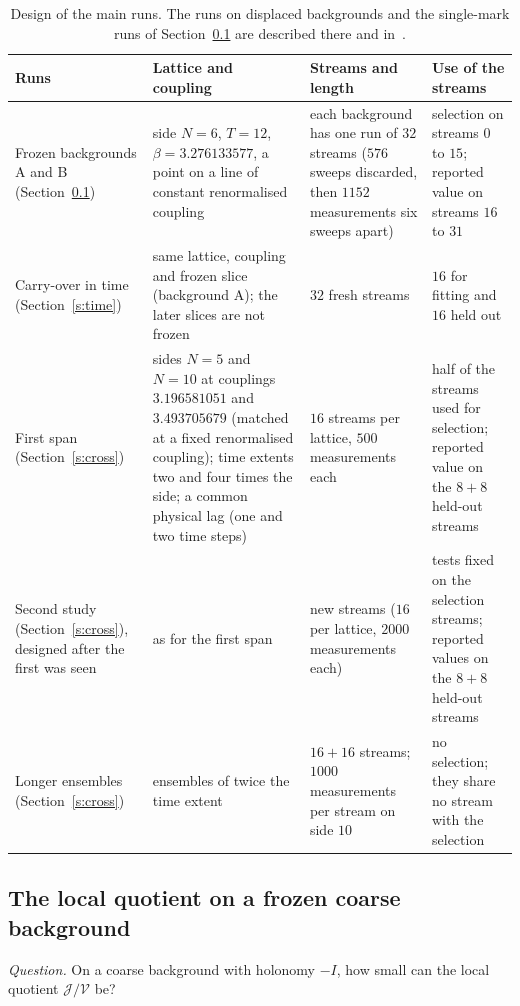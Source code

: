 \begin{table}[t]
\centering\small
\begin{tabular}{@{}>{\raggedright\arraybackslash}p{}>{\raggedright\arraybackslash}p{}>{\raggedright\arraybackslash}p{}>{\raggedright\arraybackslash}p{}@{}}
\toprule
Runs & Lattice and coupling & Streams and length & Use of the streams \\
\midrule
Frozen backgrounds \textsf{A} and \textsf{B} (Section~\ref{s:local}) &
side $N=6$, $T=12$, $\beta=3.276133577$, a point on a line of constant renormalised coupling &
each background has one run of $32$ streams ($576$ sweeps discarded, then $1152$ measurements six sweeps apart) &
selection on streams $0$ to $15$; reported value on streams $16$ to $31$ \\
\addlinespace
Carry-over in time (Section~\ref{s:time}) &
same lattice, coupling and frozen slice (background \textsf{A}); the later slices are not frozen &
$32$ fresh streams &
$16$ for fitting and $16$ held out \\
\addlinespace
First span (Section~\ref{s:cross}) &
sides $N=5$ and $N=10$ at couplings $3.196581051$ and $3.493705679$ (matched at a fixed renormalised
coupling); time extents two and four times the side; a common physical lag (one and two time steps) &
$16$ streams per lattice, $500$ measurements each &
half of the streams used for selection; reported value on the $8+8$ held-out streams \\
\addlinespace
Second study (Section~\ref{s:cross}), designed after the first was seen &
as for the first span &
new streams ($16$ per lattice, $2000$ measurements each) &
tests fixed on the selection streams; reported values on the $8+8$ held-out streams \\
\addlinespace
Longer ensembles (Section~\ref{s:cross}) &
ensembles of twice the time extent &
$16+16$ streams; $1000$ measurements per stream on side $10$ &
no selection; they share no stream with the selection \\
\bottomrule
\end{tabular}
\caption{Design of the main runs. The runs on displaced backgrounds and the single-mark runs of
Section~\ref{s:local} are described there and in~\cite{RepoData}.}\label{tab:runs}
\end{table}

\subsection{The local quotient on a frozen coarse background}\label{s:local}
\emph{Question.} On a coarse background with holonomy $-I$, how small can the local quotient
$\mathcal J/\mathcal V$ be?

